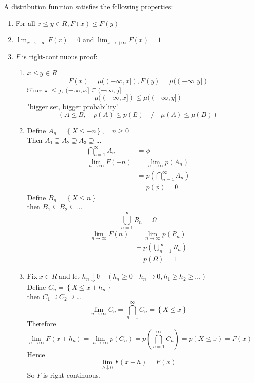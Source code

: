 \begin{theorem}
    A distribution function satisfies the following properties:
    \begin{enumerate}[label = \roman*)]
        \item For all $x \leq y \in R, F(x) \leq F(y)$
        \item $\lim_{x \to -\infty} F(x) = 0 $ and $\lim_{x \to +\infty} F(x) = 1 $
        \item $F$ is right-continuous
        proof:
        \begin{enumerate}[label = \roman*)]
            \item $x\leq y \in R$
            \[F(x) = \mu((-\infty, x]), F(y) = \mu((-\infty, y])\]
            Since $x\leq y$, \quad $(-\infty, x] \subseteq (-\infty, y]$
            \[\mu((-\infty, x])\leq \mu((-\infty, y])\]
            "bigger set, bigger probability"
            \[(A \leq B, \quad p(A) \leq p(B) \quad / \quad \mu(A)\leq \mu(B))\]
            \item Define $A_n = \left\{X\leq -n\right\}, \quad n\geq 0$
            \\Then $A_1 \supseteq A_2 \supseteq A_3 \supseteq \dots $
            \begin{align*}
                \bigcap_{n=1}^{\infty} A_n &= \phi \\
                \lim_{n \to \infty} F(-n) &= \lim_{n \to \infty} p(A_n) \\
                &= p\left(\bigcap_{n=1}^{\infty}A_n\right) \\
                &= p(\phi) = 0
            \end{align*}
            Define $B_n = \left\{X\leq n\right\}$,
            \\then $B_1 \subseteq B_2 \subseteq \dots$
            \[\bigcup_{n=1}^{\infty} B_n = \Omega\]
            \begin{align*}
                \lim_{n \to \infty} F(n) &= \lim_{n \to \infty} p(B_n) \\
                &= p\left(\bigcup_{n=1}^{\infty}B_n\right) \\
                &= p(\Omega) = 1
            \end{align*}
            \item Fix $x\in R$ and let $h_n \downarrow 0 \quad (h_n \geq 0 \quad h_n \rightarrow 0, h_1 \geq h_2 \geq \dots)$
            \\Define $C_n = \left\{X\leq x+h_n\right\}$
            \\then $C_1 \supseteq C_2 \supseteq \dots$
            \[\lim_{n \to \infty} C_n = \bigcap_{n=1}^{\infty} C_n = \left\{X\leq x\right\} \]
            Therefore
            \[\lim_{n \to \infty} F(x+h_n) = \lim_{n \to \infty} p(C_n) = p(\bigcap_{n=1}^{\infty} C_n) = p(X \leq x) = F(x) \]
            Hence
            \[\lim_{h \downarrow 0}F(x+h) = F(x)  \]
            So $F$ is right-continuous.
        \end{enumerate}
    \end{enumerate}
\end{theorem}

